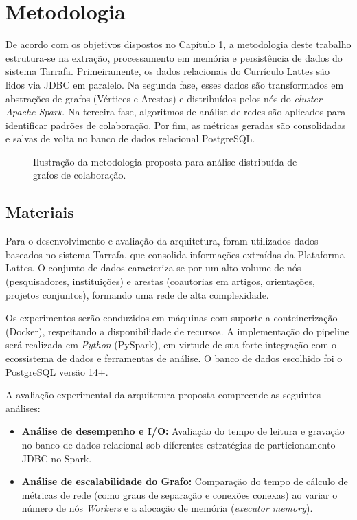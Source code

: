 \chapter{Metodologia}
\label{cap:metodologia}

De acordo com os objetivos dispostos no Capítulo 1, a metodologia deste trabalho estrutura-se na extração, processamento em memória e persistência de dados do sistema Tarrafa. Primeiramente, os dados relacionais do Currículo Lattes são lidos via JDBC em paralelo. Na segunda fase, esses dados são transformados em abstrações de grafos (Vértices e Arestas) e distribuídos pelos nós do \textit{cluster Apache Spark}. Na terceira fase, algoritmos de análise de redes são aplicados para identificar padrões de colaboração. Por fim, as métricas geradas são consolidadas e salvas de volta no banco de dados relacional PostgreSQL.

\begin{figure}[H]
    \centering
    \caption{Ilustração da metodologia proposta para análise distribuída de grafos de colaboração.}
    \label{fig:metodologia}
\end{figure}

\section{Materiais}
\label{sec:materiais}

Para o desenvolvimento e avaliação da arquitetura, foram utilizados dados baseados no sistema Tarrafa, que consolida informações extraídas da Plataforma Lattes. O conjunto de dados caracteriza-se por um alto volume de nós (pesquisadores, instituições) e arestas (coautorias em artigos, orientações, projetos conjuntos), formando uma rede de alta complexidade.

Os experimentos serão conduzidos em máquinas com suporte a conteinerização (Docker), respeitando a disponibilidade de recursos. A implementação do pipeline será realizada em \textit{Python} (PySpark), em virtude de sua forte integração com o ecossistema de dados e ferramentas de análise. O banco de dados escolhido foi o PostgreSQL versão 14+.

A avaliação experimental da arquitetura proposta compreende as seguintes análises:

\begin{itemize}
    \item \textbf{Análise de desempenho e I/O:} Avaliação do tempo de leitura e gravação no banco de dados relacional sob diferentes estratégias de particionamento JDBC no Spark.
    
    \item \textbf{Análise de escalabilidade do Grafo:} Comparação do tempo de cálculo de métricas de rede (como graus de separação e conexões conexas) ao variar o número de nós \textit{Workers} e a alocação de memória (\textit{executor memory}).
\end{itemize}

